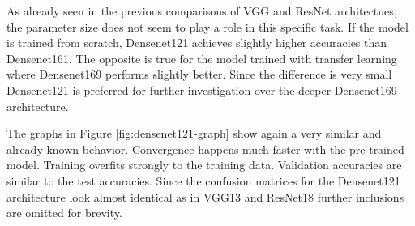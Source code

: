 \begin{table}[!h] \centering
{}
\caption{Hyper parameters for densenet121 optimized with SigOpt. First row shows hyperparameters training the architecture from scratch. Second row used pre-trained weights from ImageNet}
\label{tbl:Densenet121_overview}
\end{table}

As already seen in the previous comparisons of VGG and ResNet architectues, the parameter size does not seem to play a role in this specific task. If the model is trained from scratch, Densenet121 achieves slightly higher accuracies than Densenet161. The opposite is true for the model trained with transfer learning where Densenet169 performs slightly better. Since the difference is very small Densenet121 is preferred for further investigation over the deeper Densenet169 architecture.

The graphs in Figure \ref{fig:densenet121-graph} show again a very similar and already known behavior. Convergence happens much faster with the pre-trained model. Training overfits strongly to the training data. Validation accuracies are similar to the test accuracies. Since the confusion matrices for the Densenet121 architecture look almost identical as in VGG13 and ResNet18 further inclusions are omitted for brevity. \\


